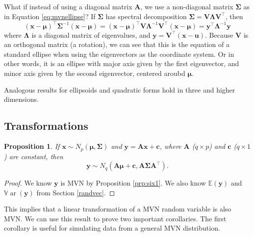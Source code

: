 \documentclass[]{book}
\newtheorem{proposition}{Proposition}[chapter]
\theoremstyle{definition}
\theoremstyle{definition}
\theoremstyle{definition}
\theoremstyle{remark}
\begin{document}
What if instead of using a diagonal matrix \(\boldsymbol A\), we use a non-diagonal matrix \(\boldsymbol \Sigma\) as in Equation \eqref{eq:mvnellipse}? If \(\boldsymbol \Sigma\) has spectral decomposition
\(\boldsymbol \Sigma= \boldsymbol V\boldsymbol \Lambda\boldsymbol V^\top\), then
\[ (\boldsymbol x-\boldsymbol \mu)^\top {\boldsymbol \Sigma}^{-1}(\boldsymbol x-\boldsymbol \mu) = (\boldsymbol x-\boldsymbol \mu)^\top \boldsymbol V\boldsymbol \Lambda^{-1}\boldsymbol V^\top(\boldsymbol x-\boldsymbol \mu) = \boldsymbol y^\top \boldsymbol \Lambda^{-1}\boldsymbol y\]
where \(\boldsymbol \Lambda\) is a diagonal matrix of eigenvalues, and \(\boldsymbol y= \boldsymbol V^\top (\boldsymbol x-\boldsymbol u)\). Because \(\boldsymbol V\) is an orthogonal matrix (a rotation), we can see that this is the equation of a standard ellipse when using the eigenvectors as the coordinate system. Or in other words, it is an ellipse
with major axis given by the first eigenvector, and minor axis given by the second eigenvector, centered aroubd \(\boldsymbol \mu\).

Analogous results for ellipsoids and quadratic forms hold in three and higher dimensions.

\hypertarget{transformations}{%
\subsection{Transformations}\label{transformations}}

\begin{proposition}
\protect\hypertarget{prp:six2}{}{\label{prp:six2} } If \(\boldsymbol x\sim N_p(\boldsymbol \mu,\boldsymbol \Sigma)\) and \(\boldsymbol y= \boldsymbol A\boldsymbol x+ \boldsymbol c\), where \(\boldsymbol A\) (\(q \times p\)) and \(\boldsymbol c\) (\(q \times 1\)) are constant, then
\[\boldsymbol y\sim N_q(\boldsymbol A\boldsymbol \mu+ \boldsymbol c, \boldsymbol A\boldsymbol \Sigma\boldsymbol A^\top).\]
\end{proposition}

\begin{proof}
{}We know \(\boldsymbol y\) is MVN by Proposition \ref{prp:six1}. We also know \({\mathbb{E}}(\boldsymbol y)\) and \({\mathbb{V}\operatorname{ar}}(\boldsymbol y)\) from Section \ref{randvec}.
\end{proof}

This implies that a linear transformation of a MVN random variable is also MVN. We can use this result to prove two important corollaries. The first corollary is useful for simulating data from a general MVN distribution.
\end{document}
